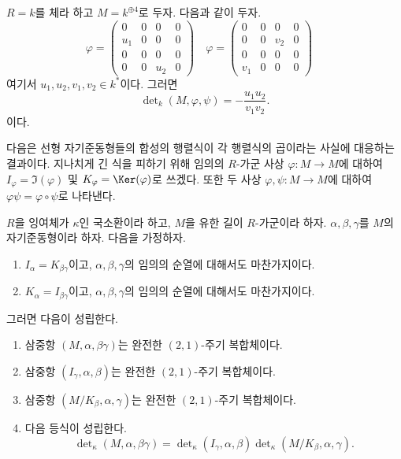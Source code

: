 \begin{example}
\label{example-a-la-oort}
$R = k$를 체라 하고 $M = k^{\oplus 4}$로 두자. 다음과 같이 두자.
$$
\varphi =
\left(
\begin{matrix}
  0 &   0 &   0 &   0 \\
u_1 &   0 &   0 &   0 \\
  0 &   0 &   0 &   0 \\
  0 &   0 & u_2 &   0
\end{matrix}
\right)
\quad
\varphi =
\left(
\begin{matrix}
  0 &   0 &   0 &   0 \\
  0 &   0 & v_2 &   0 \\
  0 &   0 &   0 &   0 \\
v_1 &   0 &   0 &   0
\end{matrix}
\right)
\quad
$$
여기서 $u_1, u_2, v_1, v_2 \in k^*$이다. 그러면
$$
\det\nolimits_k(M, \varphi, \psi) = -\frac{u_1u_2}{v_1v_2}.
$$
이다.
\end{example}

\noindent
다음은 선형 자기준동형들의 합성의 행렬식이 각 행렬식의 곱이라는
사실에 대응하는 결과이다. 지나치게 긴 식을 피하기 위해 임의의
$R$-가군 사상 $\varphi : M \to M$에 대하여
$I_\varphi = \Im(\varphi)$ 및 $K_\varphi = \Ker(\varphi)$로 쓰겠다.
또한 두 사상 $\varphi, \psi : M \to M$에 대하여
$\varphi\psi = \varphi \circ \psi$로 나타낸다.

\begin{lemma}
\label{lemma-multiplicativity-determinant}
$R$을 잉여체가 $\kappa$인 국소환이라 하고, $M$을 유한 길이
$R$-가군이라 하자. $\alpha, \beta, \gamma$를 $M$의 자기준동형이라
하자. 다음을 가정하자.
\begin{enumerate}
\item $I_\alpha = K_{\beta\gamma}$이고, $\alpha, \beta, \gamma$의 임의의
순열에 대해서도 마찬가지이다.
\item $K_\alpha = I_{\beta\gamma}$이고, $\alpha, \beta, \gamma$의 임의의
순열에 대해서도 마찬가지이다.
\end{enumerate}
그러면 다음이 성립한다.
\begin{enumerate}
\item 삼중항 $(M, \alpha, \beta\gamma)$는 완전한 $(2, 1)$-주기
복합체이다.
\item 삼중항 $(I_\gamma, \alpha, \beta)$는 완전한 $(2, 1)$-주기
복합체이다.
\item 삼중항 $(M/K_\beta, \alpha, \gamma)$는 완전한 $(2, 1)$-주기
복합체이다.
\item 다음 등식이 성립한다.
$$
\det\nolimits_\kappa(M, \alpha, \beta\gamma)
=
\det\nolimits_\kappa(I_\gamma, \alpha, \beta)
\det\nolimits_\kappa(M/K_\beta, \alpha, \gamma).
$$
\end{enumerate}
\end{lemma}

